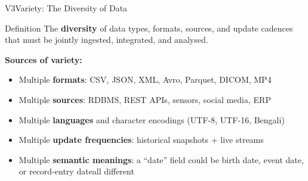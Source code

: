 \documentclass[aspectratio=169,10pt]{beamer}
\begin{document}
\begin{frame}{V3\textemdash Variety: The Diversity of Data}
      \begin{block}{Definition}
        The \textbf{diversity} of data types, formats, sources, and update cadences that must be jointly ingested, integrated, and analysed.
      \end{block}
      \vspace{6pt}
      \textbf{Sources of variety:}
      \begin{itemize}
        \item Multiple \textbf{formats}: CSV, JSON, XML, Avro, Parquet, DICOM, MP4
        \item Multiple \textbf{sources}: RDBMS, REST APIs, sensors, social media, ERP
        \item Multiple \textbf{languages} and character encodings (UTF-8, UTF-16, Bengali)
        \item Multiple \textbf{update frequencies}: historical snapshots + live streams
        \item Multiple \textbf{semantic meanings}: a ``date'' field could be birth date, event date, or record-entry date\textemdash all different
      \end{itemize}

\end{frame}
\end{document}
